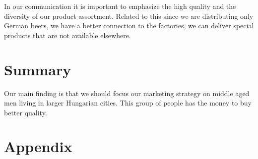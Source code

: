 In our communication it is important to emphasize the high quality and the diversity of our product assortment. Related to this since we are distributing only German beers, we have a better connection to the factories, we can deliver special products that are not available elsewhere.


\section{Summary}
Our main finding is that we should focus our marketing strategy on middle aged men living in larger Hungarian cities. This group of people has the money to buy better quality.


\newpage

\section{Appendix}




